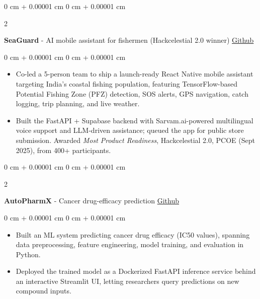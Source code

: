 \documentclass[10pt, letterpaper]{article}
\newenvironment{highlights}{
    \begin{itemize}[
        topsep=0.10 cm,
        parsep=0.10 cm,
        partopsep=0pt,
        itemsep=0pt,
        leftmargin=0 cm + 10pt
    ]
}{
    \end{itemize}
} %
\newenvironment{onecolentry}{
    \begin{adjustwidth}{
        0 cm + 0.00001 cm
    }{
        0 cm + 0.00001 cm
    }
}{
    \end{adjustwidth}
} %
\newenvironment{twocolentry}[2][]{
    \onecolentry
    \def\secondColumn{#2}
    \setcolumnwidth{\fill, 4.5 cm}
    \begin{paracol}{2}
}{
    \switchcolumn \raggedleft \secondColumn
    \end{paracol}
    \endonecolentry
} %
\begin{document}
        \begin{twocolentry}{
            \href{https://github.com/vinaypokharkar/SeaGuard}{Github}
        }
            \textbf{SeaGuard} - AI mobile assistant for fishermen (Hackcelestial 2.0 winner) \end{twocolentry}

        \vspace{0.10 cm}
        \begin{onecolentry}
            \begin{highlights}
                \item Co-led a 5-person team to ship a launch-ready React Native mobile assistant targeting India's coastal fishing population, featuring TensorFlow-based Potential Fishing Zone (PFZ) detection, SOS alerts, GPS navigation, catch logging, trip planning, and live weather.
                \item Built the FastAPI + Supabase backend with Sarvam.ai-powered multilingual voice support and LLM-driven assistance; queued the app for public store submission. Awarded \textit{Most Product Readiness}, Hackcelestial 2.0, PCOE (Sept 2025), from 400+ participants.
            \end{highlights}
        \end{onecolentry}

        \vspace{0.2 cm}

        \begin{twocolentry}{
            \href{https://github.com/vinaypokharkar/autopharmax}{Github}
        }
            \textbf{AutoPharmX} - Cancer drug-efficacy prediction \end{twocolentry}

        \vspace{0.10 cm}
        \begin{onecolentry}
            \begin{highlights}
                \item Built an ML system predicting cancer drug efficacy (IC50 values), spanning data preprocessing, feature engineering, model training, and evaluation in Python.
                \item Deployed the trained model as a Dockerized FastAPI inference service behind an interactive Streamlit UI, letting researchers query predictions on new compound inputs.
            \end{highlights}
        \end{onecolentry}
\end{document}
